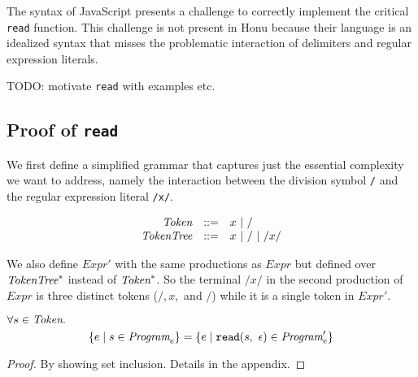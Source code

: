 \documentclass[preprint,10pt]{sigplanconf}
\begin{document}
The syntax of JavaScript presents a challenge to correctly implement
the critical \texttt{read} function. This challenge is not present in Honu
because their language is an idealized syntax that misses the
problematic interaction of delimiters and regular expression literals.

TODO: motivate \texttt{read} with examples etc.

\subsection{Proof of \texttt{read}}
\label{sec-3-1}

We first define a simplified grammar that captures just the essential
complexity we want to address, namely the interaction between
the division symbol \texttt{/} and the regular expression literal
\texttt{/x/}.

\[
\begin{array}{rrl}
  \textit{Token} &::=& x ~|~ /
  \\
  \textit{TokenTree} &::=& x ~|~ / ~|~ /x/
  \\
\end{array}
\]

We also define \( \textit{Expr}' \) with the same productions as \(
\textit{Expr} \) but defined over \( \textit{TokenTree}^{*} \) instead of \( \textit{Token}^{*}
\). So the terminal \( /x/ \) in the second production of \(
\textit{Expr} \) is three distinct tokens (\( /, x, \) and \( /
\)) while it is a single token in \( \textit{Expr}' \).


\begin{theorem}\mbox{}

  \( \forall s \in \textit{Token}. \)
  \[
  \{ e \mid s \in \textit{Program}_{e} \}
  =
  \{ e \mid \texttt{read}(s,~\epsilon) \in \textit{Program}_{e}' \}
  \]
\end{theorem}
\begin{proof}\mbox{}
  
By showing set inclusion. Details in the appendix.
\end{proof}
\end{document}
